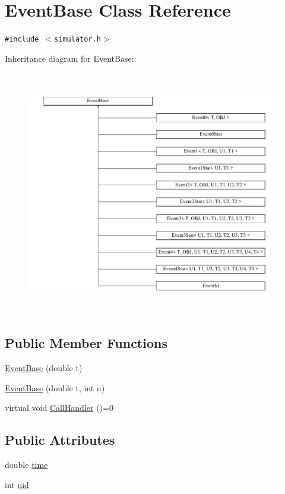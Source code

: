 \hypertarget{classEventBase}{
\section{EventBase Class Reference}
\label{classEventBase}
}
{\tt \#include $<$simulator.h$>$}

Inheritance diagram for EventBase::\begin{figure}[H]
\begin{center}
\leavevmode
\includegraphics[height=10.7692cm]{classEventBase}
\end{center}
\end{figure}
\subsection*{Public Member Functions}
\begin{CompactItemize}
\item 
\hyperlink{classEventBase_e95c43af6512ec2ab717eeb240ecad0a}{EventBase} (double t)
\item 
\hyperlink{classEventBase_0213a35ffa61ce4f7066128e89da5af8}{EventBase} (double t, int u)
\item 
virtual void \hyperlink{classEventBase_121ca64dec88c8d9589c064b0060d037}{CallHandler} ()=0
\end{CompactItemize}
\subsection*{Public Attributes}
\begin{CompactItemize}
\item 
double \hyperlink{classEventBase_b64e6661c521961aa3a18b8ac34566ed}{time}
\item 
int \hyperlink{classEventBase_f22f14be6b15b6f99d347b8726a7613a}{uid}
\end{CompactItemize}
